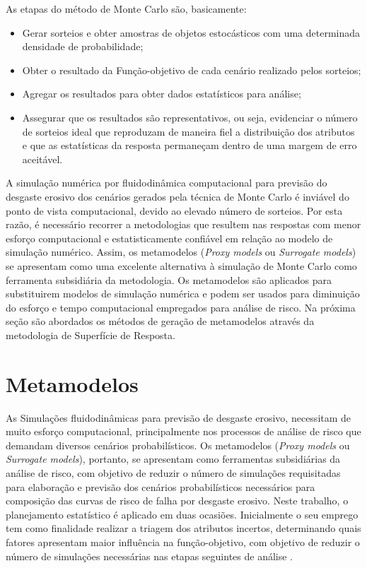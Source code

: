 As etapas do método de Monte Carlo são, basicamente:

\begin{itemize}
  \item Gerar sorteios e obter amostras de objetos estocásticos com uma determinada densidade de
probabilidade;
  \item Obter o resultado da Função-objetivo de cada cenário realizado pelos sorteios;
  \item Agregar os resultados para obter dados estatísticos para análise;
  \item Assegurar que os resultados são representativos, ou seja, evidenciar o número de sorteios ideal que reproduzam de maneira fiel a distribuição dos atributos e que as estatísticas da resposta permaneçam dentro de uma margem de erro aceitável.
\end{itemize}

A simulação numérica por fluidodinâmica computacional para previsão do desgaste erosivo dos cenários gerados pela técnica de Monte Carlo é inviável do ponto de vista computacional, devido ao elevado número de sorteios. Por esta razão, é necessário recorrer a metodologias que resultem nas respostas com menor esforço computacional e estatisticamente confiável em relação ao modelo de simulação numérico. Assim, os metamodelos (\textit{Proxy models} ou \textit{Surrogate models}) se apresentam como uma excelente alternativa à simulação de Monte Carlo como ferramenta subsidiária da metodologia. Os metamodelos são aplicados para substituirem modelos de simulação numérica e podem ser usados para diminuição do esforço e tempo computacional empregados para análise de risco. Na próxima seção são abordados os métodos de geração de metamodelos através da metodologia de Superfície de Resposta.

\section{Metamodelos}

As Simulações fluidodinâmicas para previsão de desgaste erosivo, necessitam de muito esforço computacional, principalmente nos processos de análise de risco que demandam diversos cenários probabilísticos.
Os metamodelos (\textit{Proxy models} ou \textit{Surrogate models}), portanto, se apresentam como ferramentas subsidiárias da análise de risco, com objetivo de reduzir o número de simulações requisitadas para elaboração e previsão dos cenários probabilísticos necessários para composição das curvas de risco de falha por desgaste erosivo.
Neste trabalho, o planejamento estatístico é aplicado em duas ocasiões. Inicialmente o seu emprego tem como finalidade realizar a triagem dos atributos incertos, determinando quais fatores apresentam maior influência na função-objetivo, com objetivo de reduzir o número de simulações necessárias nas etapas seguintes de análise \cite{Lih}.

